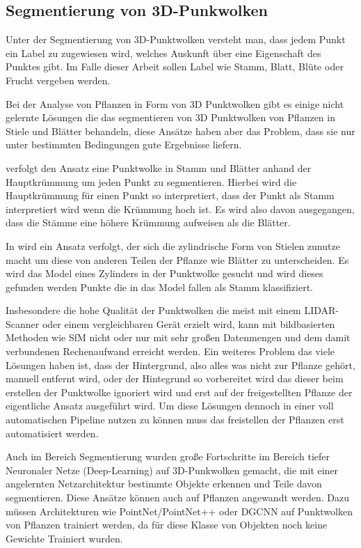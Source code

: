 \documentclass[12pt,titlepage, twoside]{article}
\begin{document}

\subsection{Segmentierung von 3D-Punkwolken}
\label{sec:stand:segmentierung}

Unter der Segmentierung von 3D-Punktwolken versteht man, dass jedem Punkt ein Label zu zugewiesen wird, welches Auskunft über eine Eigenschaft des Punktes gibt. Im Falle dieser Arbeit sollen Label wie Stamm, Blatt, Blüte oder Frucht vergeben werden.

Bei der Analyse von Pflanzen in Form von 3D Punktwolken gibt es einige nicht gelernte Lösungen \cite{ThreeBasics} \cite{ModelBased} die das segmentieren von 3D Punktwolken von Pflanzen in Stiele und Blätter behandeln, 
diese Ansätze haben aber das Problem, dass sie nur unter bestimmten Bedingungen gute Ergebnisse liefern.

\cite{ThreeBasics} verfolgt den Ansatz eine Punktwolke in Stamm und Blätter anhand der Hauptkrümmung um jeden Punkt zu segmentieren. 
Hierbei wird die Hauptkrümmung für einen Punkt so interpretiert, dass der Punkt als Stamm interpretiert wird wenn die Krümmung hoch ist. 
Es wird also davon ausgegangen, dass die Stämme eine höhere Krümmung aufweisen als die Blätter. 

In \cite{ModelBased}  wird ein Ansatz verfolgt, der sich die zylindrische Form von Stielen zunutze macht um diese von anderen Teilen der Pflanze wie Blätter zu unterscheiden. 
Es wird das Model eines Zylinders in der Punktwolke gesucht und wird dieses gefunden werden Punkte die in das Model fallen als Stamm klassifiziert.

Insbesondere die hohe Qualität der Punktwolken die meist mit einem LIDAR-Scanner oder einem vergleichbaren Gerät erzielt wird, 
kann mit bildbasierten Methoden wie SfM nicht oder nur mit sehr großen Datenmengen und dem damit verbundenen Rechenaufwand erreicht werden. 
Ein weiteres Problem das viele Lösungen haben ist, dass der Hintergrund, also alles was nicht zur Pflanze gehört, manuell entfernt wird, 
oder der Hintegrund so vorbereitet wird das dieser beim erstellen der Punktwolke ignoriert wird und erst auf der freigestellten Pflanze der eigentliche Ansatz ausgeführt wird. 
Um diese Lösungen dennoch in einer voll automatischen Pipeline nutzen zu können muss das freistellen der Pflanzen erst automatisiert werden.

Auch im Bereich Segmentierung wurden große Fortschritte im Bereich tiefer Neuronaler Netze (Deep-Learning) \cite{lecun2015deep} auf 3D-Punkwolken gemacht, die mit einer angelernten Netzarchitektur bestimmte Objekte erkennen und Teile davon segmentieren. 
Diese Ansätze können auch auf Pflanzen angewandt werden. Dazu müssen Architekturen wie PointNet\cite{qi2017pointnet}/PointNet++\cite{qi2017pointnet++} oder DGCNN \cite{dgcnn} auf Punktwolken von Pflanzen trainiert werden, 
da für diese Klasse von Objekten noch keine Gewichte Trainiert wurden.
\end{document}
